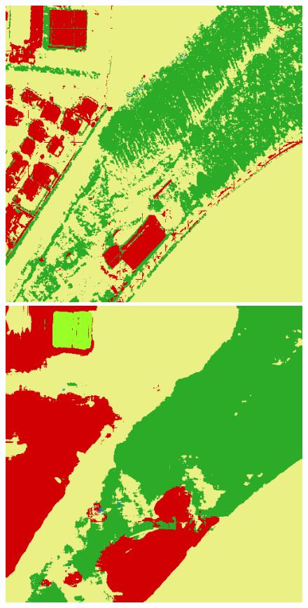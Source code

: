 {\begin{figure}
    \includegraphics[width=\DiscussionImageWidth]{images/segmentation_discussion/densenet/755.png} \hfill
    \includegraphics[width=\DiscussionImageWidth]{images/segmentation_discussion/unet/755.png}


\end{figure}}
